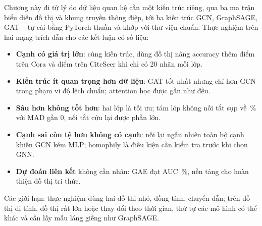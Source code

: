 Chương này đi từ lý do dữ liệu quan hệ cần một kiến trúc riêng, qua ba ma trận biểu diễn đồ thị và khung truyền thông
điệp, tới ba kiến trúc GCN, GraphSAGE, GAT -- tự cài bằng PyTorch thuần và khớp với thư viện chuẩn. Thực nghiệm trên hai
mạng trích dẫn cho các kết luận có số liệu:
\begin{itemize}
  \item \textbf{Cạnh có giá trị lớn}: cùng kiến trúc, dùng đồ thị nâng accuracy thêm 
        điểm trên Cora và  điểm trên CiteSeer khi chỉ có 20 nhãn mỗi lớp.
  \item \textbf{Kiến trúc ít quan trọng hơn dữ liệu}: GAT tốt nhất nhưng chỉ hơn GCN trong phạm vi độ lệch chuẩn; attention
        học được gần như đều.
  \item \textbf{Sâu hơn không tốt hơn}: hai lớp là tối ưu; tám lớp không nối tắt sụp về \,\%
        với MAD gần 0, nối tắt cứu lại được phần lớn.
  \item \textbf{Cạnh sai còn tệ hơn không có cạnh}: nối lại ngẫu nhiên toàn bộ cạnh khiến GCN kém MLP; homophily là điều
        kiện cần kiểm tra trước khi chọn GNN.
  \item \textbf{Dự đoán liên kết} không cần nhãn: GAE đạt AUC \,\%, nền tảng cho hoàn thiện
        đồ thị tri thức.
\end{itemize}
Các giới hạn: thực nghiệm dùng hai đồ thị nhỏ, đồng tính, chuyển dẫn; trên đồ thị dị tính, đồ thị rất lớn hoặc thay đổi
theo thời gian, thứ tự các mô hình có thể khác và cần lấy mẫu láng giềng như GraphSAGE.
